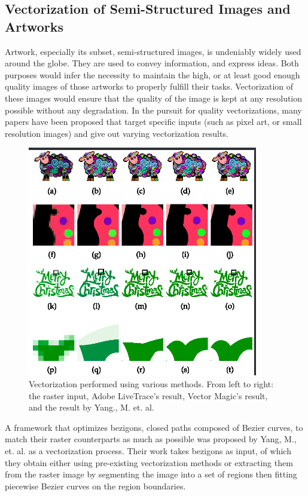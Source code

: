 \subsection{Vectorization of Semi-Structured Images and Artworks}
Artwork, especially its subset, semi-structured images, is undeniably widely used around the globe. They are used to convey information, and express ideas. Both purposes would infer the necessity to maintain the high, or at least good enough quality images of those artworks to properly fulfill their tasks. Vectorization of these images would ensure that the quality of the image is kept at any resolution possible without any degradation. In the pursuit for quality vectorizations, many papers have been proposed that target specific inputs (such as pixel art, or small resolution images) and give out varying vectorization results.

\begin{figure}[h]
	\centering
	\includegraphics[scale=0.75]{images/chap02-rrl/optimization.png}
	\caption{Vectorization performed using various methods. From left to right: the raster input, Adobe LiveTrace's result, Vector Magic's result, and the result by Yang., M. et. al.}
	\label{fig:curve-optimization}
\end{figure}

A framework that optimizes bezigons, closed paths composed of Bezier curves, to match their raster counterparts as much as possible was proposed by Yang, M., et. al. as a vectorization process. Their work takes bezigons as input, of which they obtain either using pre-existing vectorization methods or extracting them from the raster image by segmenting the image into a set of regions then fitting piecewise Bezier curves on the region boundaries.


